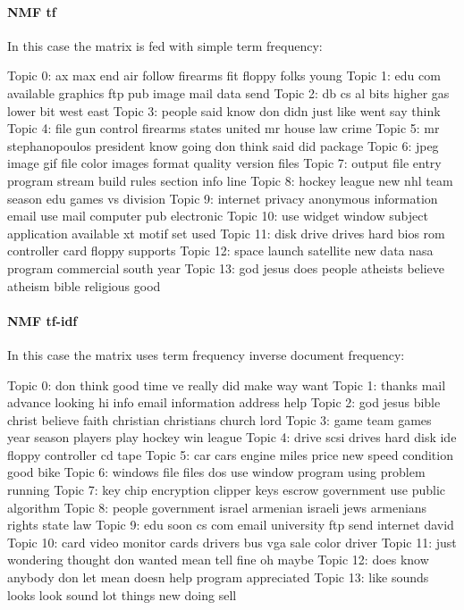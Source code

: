 \documentclass[12pt,a4paper]{report}
\begin{document}
\pagebreak

\begin{multicols}{2}
\paragraph{NMF tf} In this case the matrix is fed with simple term frequency:
\begin{spverbatim}
Topic 0:
ax max end air follow firearms fit floppy folks young
Topic 1:
edu com available graphics ftp pub image mail data send
Topic 2:
db cs al bits higher gas lower bit west east
Topic 3:
people said know don didn just like went say think
Topic 4:
file gun control firearms states united mr house law crime
Topic 5:
mr stephanopoulos president know going don think said did package
Topic 6:
jpeg image gif file color images format quality version files
Topic 7:
output file entry program stream build rules section info line
Topic 8:
hockey league new nhl team season edu games vs division
Topic 9:
internet privacy anonymous information email use mail computer pub electronic
Topic 10:
use widget window subject application available xt motif set used
Topic 11:
disk drive drives hard bios rom controller card floppy supports
Topic 12:
space launch satellite new data nasa program commercial south year
Topic 13:
god jesus does people atheists believe atheism bible religious good

\end{spverbatim}
\columnbreak
\paragraph{NMF tf-idf} In this case the matrix uses term frequency inverse document frequency:
\begin{spverbatim}
Topic 0:
don think good time ve really did make way want
Topic 1:
thanks mail advance looking hi info email information address help
Topic 2:
god jesus bible christ believe faith christian christians church lord
Topic 3:
game team games year season players play hockey win league
Topic 4:
drive scsi drives hard disk ide floppy controller cd tape
Topic 5:
car cars engine miles price new speed condition good bike
Topic 6:
windows file files dos use window program using problem running
Topic 7:
key chip encryption clipper keys escrow government use public algorithm
Topic 8:
people government israel armenian israeli jews armenians rights state law
Topic 9:
edu soon cs com email university ftp send internet david
Topic 10:
card video monitor cards drivers bus vga sale color driver
Topic 11:
just wondering thought don wanted mean tell fine oh maybe
Topic 12:
does know anybody don let mean doesn help program appreciated
Topic 13:
like sounds looks look sound lot things new doing sell

\end{spverbatim}
\end{multicols}
\end{document}
